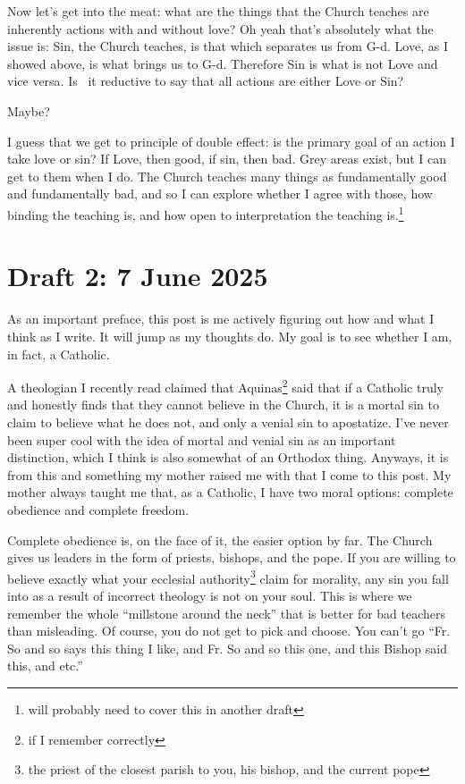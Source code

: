 \documentclass[12pt]{article}
\newcommand{\say}[1]{``#1''}
\renewcommand{\,}{\textsuperscript{,}}
\begin{document}
Now let's get into the meat: what are the things that the Church teaches are inherently actions with and without love?  
Oh yeah that's absolutely what the issue is: Sin, the Church teaches, is that which separates us from G-d.  
Love, as I showed above, is what brings us to G-d.  
Therefore Sin is what is not Love and vice versa.  
Is  it reductive to say that all actions are either Love or Sin?

Maybe?

I guess that we get to principle of double effect: is the primary goal of an action I take love or sin?  
If Love, then good, if sin, then bad.  
Grey areas exist, but I can get to them when I do.  
The Church teaches many things as fundamentally good and fundamentally bad, and so I can explore whether I agree with those, how binding the teaching is, and how open to interpretation the teaching is.\footnote{will probably need to cover this in another draft}

\section{Draft 2: 7 June 2025}

As an important preface, this post is me actively figuring out how and what I think as I write.  
It will jump as my thoughts do.  
My goal is to see whether I am, in fact, a Catholic.

A theologian I recently read claimed that Aquinas\footnote{if I remember correctly} said that if a Catholic truly and honestly finds that they cannot believe in the Church, it is a mortal sin to claim to believe what he does not, and only a venial sin to apostatize.  
I've never been super cool with the idea of mortal and venial sin as an important distinction, which I think is also somewhat of an Orthodox thing.  
Anyways, it is from this and something my mother raised me with that I come to this post.  
My mother always taught me that, as a Catholic, I have two moral options: complete obedience and complete freedom.

Complete obedience is, on the face of it, the easier option by far.  
The Church gives us leaders in the form of priests, bishops, and the pope.  
If you are willing to believe exactly what your ecclesial authority\footnote{the priest of the closest parish to you, his bishop, and the current pope} claim for morality, any sin you fall into as a result of incorrect theology is not on your soul.  
This is where we remember the whole \say{millstone around the neck} that is better for bad teachers than misleading.  
Of course, you do not get to pick and choose.  
You can't go \say{Fr. So and so says this thing I like, and Fr. So and so this one, and this Bishop said this, and etc.}
\end{document}
